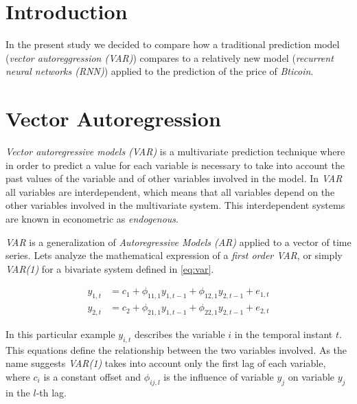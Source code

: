 
\chapter{Introduction}
\label{ch:mat_introduction}

In the present study we decided to compare how a traditional
prediction model (\textit{vector autoreggression (VAR)}) compares to a
relatively new model (\textit{recurrent neural networks (RNN)})
applied to the prediction of the price of \textit{Bticoin}.

\chapter{Vector Autoregression}
\label{ch:vector-autoregression}

\textit{Vector autoregressive models (VAR)} is a multivariate
prediction technique where in order to predict a value for each
variable is necessary to take into account the past values of the
variable and of other variables involved in the model. In \textit{VAR}
all variables are interdependent, which means that all variables
depend on the other variables involved in the multivariate system.
This interdependent systems are known in econometric as
\textit{endogenous}.

\textit{VAR} is a generalization of \textit{Autoregressive Models
  (AR)} applied to a vector of time series. Lets analyze the
mathematical expression of a \textit{first order VAR}, or simply
\textit{VAR(1)} for a bivariate system defined in \autoref{eq:var}.

\begin{equation}
  \begin{aligned}
    \label{eq:var}
    y_{1,t} & = c_1 + \phi_{11,1} y_{1,t-1} + \phi_{12,1} y_{2,t-1} +
    e_{1,t} \\
    y_{2,t} & = c_2 + \phi_{21,1} y_{1,t-1} + \phi_{22,1} y_{2,t-1} +
    e_{2,t} 
  \end{aligned}
\end{equation}

In this particular example $y_{i, t}$ describes the variable $i$ in
the temporal instant $t$. This equations define the relationship
between the two variables involved. As the name suggests
\textit{VAR(1)} takes into account only the first lag of each
variable, where $c_i$ is a constant offset and $\phi_{ij,l}$ is the
influence of variable $y_j$ on variable $y_j$ in the $l$-th lag.


